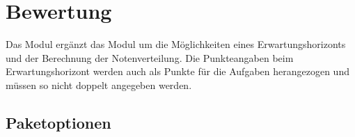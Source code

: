 \section{Bewertung}
\label{modul:bewertung}
Das Modul  ergänzt das Modul  um die Möglichkeiten eines Erwartungshorizonts und der Berechnung der Notenverteilung. Die Punkteangaben beim Erwartungshorizont werden auch als Punkte für die Aufgaben herangezogen und müssen so nicht doppelt angegeben werden.


\subsection{Paketoptionen}
